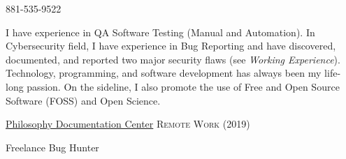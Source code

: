 \documentclass[11pt,a4paper]{article} %
\begin{document}


\noindent\bull{}

\noindent\bull{} 881-535-9522 %

\noindent\bull{}



\noindent I have experience in QA Software Testing (Manual and Automation). In Cybersecurity field, I have experience in Bug Reporting and have discovered, documented, and reported two
major security flaws (see \textit{Working Experience}). Technology, programming, and software development has always been my life-long passion.
On the sideline, I also promote the use of Free and Open Source Software (FOSS) and Open Science.

\vspace{-1em} %




\headedsection %
{\href{https://www.pdcnet.org/}{Philosophy Documentation Center}}
{\dotfill\textsc{Remote Work (2019)}} {

    \headedsubsection %
    { Freelance Bug Hunter}
    {}
    {}
}
\end{document}
